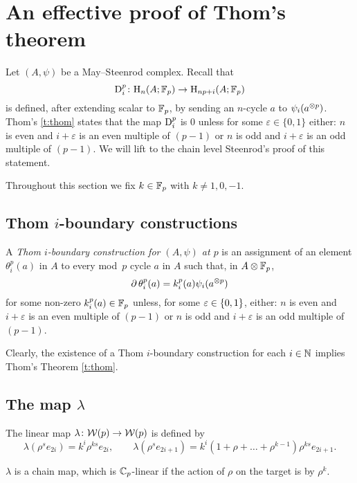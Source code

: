 
\appendix
\section{An effective proof of Thom's theorem}\label{s:thom}


Let $(A,\psi)$ be a May--Steenrod complex.
Recall that
\[
\mathrm{D}_i^p \colon \mathrm{H}_n(A; {\mathbb{F}_p}) \to \mathrm{H}_{np+i}(A; {\mathbb{F}_p})
\]
is defined, after extending scalar to ${\mathbb{F}_p}$, by sending an $n$-cycle $a$ to $\psi_i(a^{\otimes p})$.
Thom's \cref{t:thom} states that the map $\mathrm{D}_i^p$ is $0$ unless for some $\varepsilon \in \{0,1\}$ either: $n$ is even and $i+\varepsilon$ is an even multiple of $(p-1)$ or $n$ is odd and $i+\varepsilon$ is an odd multiple of $(p-1)$.
We will lift to the chain level Steenrod's proof of this statement.

Throughout this section we fix $k \in {\mathbb{F}_p}$ with $k \neq 1,0,-1$.

\subsection{Thom $i$-boundary constructions}

A \textit{Thom $i$-boundary construction for $(A,\psi)$ at $p$} is an assignment of an element $\theta_i^p(a)$ in $A$ to every mod~$p$ cycle $a$ in $A$ such that, in $A \otimes {\mathbb{F}_p}$,
\[
\operatorname{\partial} \theta_i^p(a) = k_i^p(a) \psi_i(a^{\otimes p})
\]
for some non-zero $k^p_i(a) \in {\mathbb{F}_p}$ unless, for some $\varepsilon \in \{0,1\}$, either: $n$ is even and $i+\varepsilon$ is an even multiple of $(p-1)$ or $n$ is odd and $i+\varepsilon$ is an odd multiple of $(p-1)$.

Clearly, the existence of a Thom $i$-boundary construction for each $i \in \mathbb{N}$ implies Thom's Theorem \cref{t:thom}.

\subsection{The map $\lambda$}

The linear map $\lambda \colon \mathcal{W}(p) \to \mathcal{W}(p)$ is defined by
\[
\lambda(\rho^s e_{2i}) = k^i \rho^{ks} e_{2i}, \qquad
\lambda(\rho^s e_{2i+1}) = k^i (1+\rho+\dots+\rho^{k-1}) \rho^{ks} e_{2i+1}.
\]

\begin{lemma}
	$\lambda$ is a chain map, which is $\mathbb{C}_p$-linear if the action of $\rho$ on the target is by $\rho^k$.
\end{lemma}

